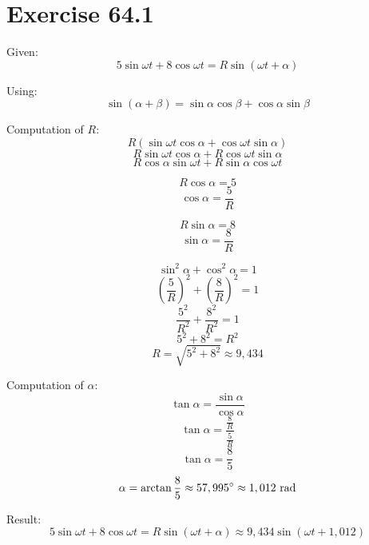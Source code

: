 \documentclass[a4paper, 10pt]{scrartcl}
\begin{document}
\section{Exercise 64.1}

Given:
\[5\sin{\omega t} + 8\cos{\omega t} = R\sin{(\omega t + \alpha)}\]

Using:
\[\sin{(\alpha + \beta)} = \sin{\alpha}\cos{\beta} + \cos{\alpha}\sin{\beta}\]

Computation of $R$:
\[R(\sin{\omega t}\cos{\alpha} + \cos{\omega t}\sin{\alpha})\]
\[R\sin{\omega t}\cos{\alpha} + R\cos{\omega t}\sin{\alpha}\]
\[R\cos{\alpha}\sin{\omega t} + R\sin{\alpha}\cos{\omega t}\]

\[R\cos{\alpha} = 5\]
\[\cos{\alpha} = \frac{5}{R}\]

\[R\sin{\alpha} = 8\]
\[\sin{\alpha} = \frac{8}{R}\]

\[\sin^{2}{\alpha} + \cos^{2}{\alpha} = 1\]
\[\left(\frac{5}{R}\right)^{2} + \left(\frac{8}{R}\right)^{2} = 1\]
\[\frac{5^{2}}{R^{2}} + \frac{8^{2}}{R^{2}} = 1\]
\[5^{2} + 8^{2} = R^{2}\]
\[R = \sqrt{5^{2} + 8^{2}} \approx 9,434\]

Computation of $\alpha$:
\[\tan{\alpha} = \frac{\sin{\alpha}}{\cos{\alpha}}\]
\[\tan{\alpha} = \frac{\frac{8}{R}}{\frac{5}{R}}\]
\[\tan{\alpha} = \frac{8}{5}\]
\[\alpha = \arctan{\frac{8}{5}} \approx 57,995^\circ \approx 1,012\textnormal{ rad}\]

Result:
\[5\sin{\omega t} + 8\cos{\omega t} = R\sin{(\omega t + \alpha)} \approx
9,434\sin{(\omega t + 1,012)}\]
\end{document}
